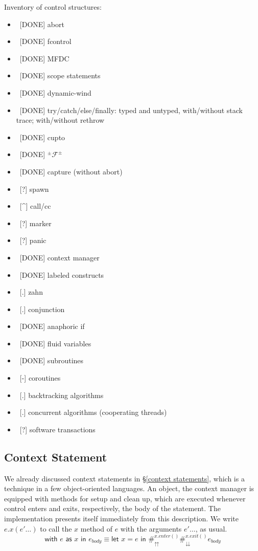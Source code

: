 \documentclass[11pt]{article}
\newcommand{\maybePage}{\newpage}
\newcommand{\letin}[2]{\textsf{let }#1\textsf{ in }#2}
\newcommand\F{\mathcal{F}}
\newcommand\pmFpm{^\pm\F^\pm}
\begin{document}
Inventory of control structures:
\begin{itemize}
\item\ [DONE] abort
\item\ [DONE] fcontrol
\item\ [DONE] MFDC
\item\ [DONE] scope statements
\item\ [DONE] dynamic-wind
\item\ [DONE] try/catch/else/finally: typed and untyped, with/without stack trace; with/without rethrow
\item\ [DONE] cupto
\item\ [DONE] $\pmFpm$
\item\ [DONE] capture (without abort)
%
\item\ [?] spawn
\item\ [\^{}] call/cc
\item\ [?] marker
\item\ [?] panic
%
\item\ [DONE] context manager
\item\ [DONE] labeled constructs
\item\ [.] zahn
\item\ [.] conjunction
\item\ [DONE] anaphoric if
\item\ [DONE] fluid variables
\item\ [DONE] subroutines
\item\ [-] coroutines
\item\ [.] backtracking algorithms
\item\ [.] concurrent algorithms (cooperating threads)
\item\ [?] software transactions
\end{itemize}


\maybePage
\subsection{Context Statement}

We already discussed context statements in \S\ref{context statements}, which is a technique in a few object-oriented languages.
An object, the context manager is equipped with methods for setup and clean up, which are executed whenever control enters and exits, respectively, the body of the statement.
The implementation presents itself immediately from this description.
We write $e.x(e'\ldots)$ to call the $x$ method of $e$ with the arguments $e'\ldots$, as usual.
$$\textsf{with }e\textsf{ as }x\textsf{ in }e_{body}
\equiv
	\letin{x = e}{\#_\upuparrows^{x.enter()}\#_\downdownarrows^{x.exit()}e_{body}}$$
\end{document}
